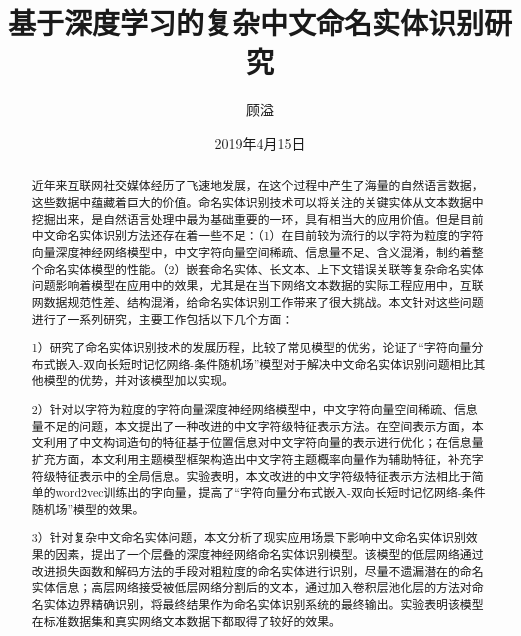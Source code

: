 \documentclass[winfonts,master,oneside,nobackinfo]{njuthesis}
\title{基于深度学习的复杂中文命名实体识别研究}
\author{顾溢}
\institute{南京大学}
\date{2019年4月15日}
\begin{document}

\maketitle
\makeenglishtitle



\begin{abstract}

近年来互联网社交媒体经历了飞速地发展，在这个过程中产生了海量的自然语言数据，这些数据中蕴藏着巨大的价值。命名实体识别技术可以将关注的关键实体从文本数据中挖掘出来，是自然语言处理中最为基础重要的一环，具有相当大的应用价值。但是目前中文命名实体识别方法还存在着一些不足：（1）在目前较为流行的以字符为粒度的字符向量深度神经网络模型中，中文字符向量空间稀疏、信息量不足、含义混淆，制约着整个命名实体模型的性能。（2）嵌套命名实体、长文本、上下文错误关联等复杂命名实体问题影响着模型在应用中的效果，尤其是在当下网络文本数据的实际工程应用中，互联网数据规范性差、结构混淆，给命名实体识别工作带来了很大挑战。本文针对这些问题进行了一系列研究，主要工作包括以下几个方面：

1）研究了命名实体识别技术的发展历程，比较了常见模型的优劣，论证了“字符向量分布式嵌入-双向长短时记忆网络-条件随机场”模型对于解决中文命名实体识别问题相比其他模型的优势，并对该模型加以实现。

2）针对以字符为粒度的字符向量深度神经网络模型中，中文字符向量空间稀疏、信息量不足的问题，本文提出了一种改进的中文字符级特征表示方法。在空间表示方面，本文利用了中文构词造句的特征基于位置信息对中文字符向量的表示进行优化；在信息量扩充方面，本文利用主题模型框架构造出中文字符主题概率向量作为辅助特征，补充字符级特征表示中的全局信息。实验表明，本文改进的中文字符级特征表示方法相比于简单的word2vec训练出的字向量，提高了“字符向量分布式嵌入-双向长短时记忆网络-条件随机场”模型的效果。

3）针对复杂中文命名实体问题，本文分析了现实应用场景下影响中文命名实体识别效果的因素，提出了一个层叠的深度神经网络命名实体识别模型。该模型的低层网络通过改进损失函数和解码方法的手段对粗粒度的命名实体进行识别，尽量不遗漏潜在的命名实体信息；高层网络接受被低层网络分割后的文本，通过加入卷积层池化层的方法对命名实体边界精确识别，将最终结果作为命名实体识别系统的最终输出。实验表明该模型在标准数据集和真实网络文本数据下都取得了较好的效果。


\end{abstract}
\end{document}
